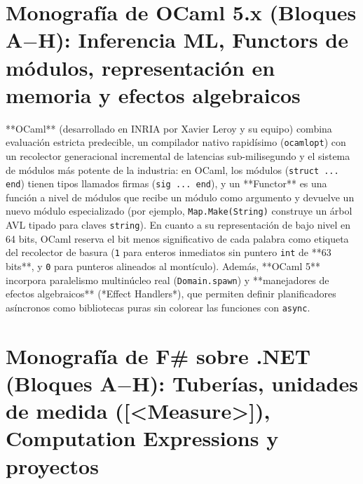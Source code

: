\documentclass{book}
\begin{document}
\section{Monografía de OCaml 5.x (Bloques A\(-\)H): Inferencia ML, Functors de módulos, representación en memoria y efectos algebraicos}

**OCaml** (desarrollado en INRIA por Xavier Leroy y su equipo) combina evaluación estricta predecible, un compilador nativo rapidísimo (\texttt{ocamlopt}) con un recolector generacional incremental de latencias sub-milisegundo y el sistema de módulos más potente de la industria: en OCaml, los módulos (\texttt{struct ... end}) tienen tipos llamados firmas (\texttt{sig ... end}), y un **Functor** es una función a nivel de módulos que recibe un módulo como argumento y devuelve un nuevo módulo especializado (por ejemplo, \texttt{Map.Make(String)} construye un árbol AVL tipado para claves \texttt{string}). En cuanto a su representación de bajo nivel en 64 bits, OCaml reserva el bit menos significativo de cada palabra como etiqueta del recolector de basura (\texttt{1} para enteros inmediatos sin puntero \texttt{int} de **63 bits**, y \texttt{0} para punteros alineados al montículo). Además, **OCaml 5** incorpora paralelismo multinúcleo real (\texttt{Domain.spawn}) y **manejadores de efectos algebraicos** (*Effect Handlers*), que permiten definir planificadores asíncronos como bibliotecas puras sin colorear las funciones con \texttt{async}.

\section{Monografía de F\# sobre .NET (Bloques A\(-\)H): Tuberías, unidades de medida ([<Measure>]), Computation Expressions y proyectos}
\end{document}
